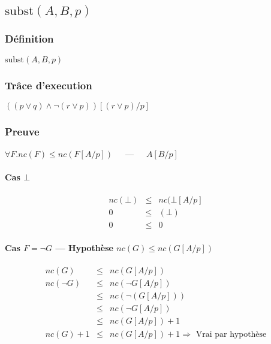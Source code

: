 \documentclass[12pt,a4paper,openany]{report}
\begin{document}
		\subsection{$\textrm{subst}(A,B,p)$}
		\subsubsection{Définition} $\textrm{subst}(A,B,p)$
		\subsubsection{Trâce d'execution} $( ( p \vee q ) \wedge \neg(r \vee p)) [(r \vee p) / p]$
		\subsubsection{Preuve} $\forall F. nc(F) \leq nc(F[A/p])$~~~---~~~$A[B/p]$
		\paragraph{Cas $\bot$}
		\begin{eqnarray*}
			nc(\bot) &\leq& nc(\bot[A/p]\\
			0 &\leq& (\bot)\\
			0 &\leq& 0
		\end{eqnarray*}

		\paragraph{Cas $F=\neg G$ --- Hypothèse $nc(G) \leq nc(G[A/p])$}
		\begin{eqnarray*}
			nc(G) &\leq& nc(G[A/p])\\
			 nc(\neg G) &\leq& nc(\neg G[A/p])\\
			 &\leq& nc(\neg(G[A/p]))\\
			&\leq& nc(\neg G[A/p])\\
			&\leq& nc(G[A/p])+1\\	
			nc(G) +1 &\leq& nc(G[A/p]) +1 \Rightarrow \textrm{ Vrai par hypothèse}
		\end{eqnarray*}
\end{document}
